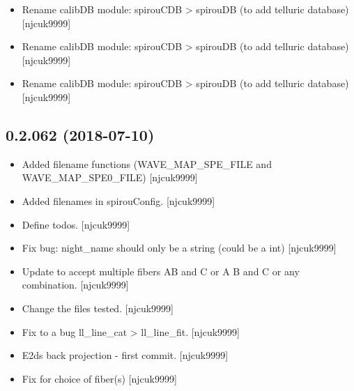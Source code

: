 \documentclass[a4paper,10pt,english]{report}
\begin{document}
\begin{itemize}
\item {} 
Rename calibDB module: spirouCDB \textendash{}\textgreater{} spirouDB (to add telluric
database) {[}njcuk9999{]}

\item {} 
Rename calibDB module: spirouCDB \textendash{}\textgreater{} spirouDB (to add telluric
database) {[}njcuk9999{]}

\item {} 
Rename calibDB module: spirouCDB \textendash{}\textgreater{} spirouDB (to add telluric
database) {[}njcuk9999{]}

\end{itemize}


\subsection{0.2.062 (2018-07-10)}
\label{\detokenize{misc/changelog:id396}}\begin{itemize}
\item {} 
Added filename functions (WAVE\_MAP\_SPE\_FILE and WAVE\_MAP\_SPE0\_FILE)
{[}njcuk9999{]}

\item {} 
Added filenames in spirouConfig. {[}njcuk9999{]}

\item {} 
Define todos. {[}njcuk9999{]}

\item {} 
Fix bug: night\_name should only be a string (could be a int)
{[}njcuk9999{]}

\item {} 
Update to accept multiple fibers AB and C or A B and C or any
combination. {[}njcuk9999{]}

\item {} 
Change the files tested. {[}njcuk9999{]}

\item {} 
Fix to a bug ll\_line\_cat \textendash{}\textgreater{} ll\_line\_fit. {[}njcuk9999{]}

\item {} 
E2ds back projection - first commit. {[}njcuk9999{]}

\item {} 
Fix for choice of fiber(s) {[}njcuk9999{]}

\end{itemize}
\end{document}

